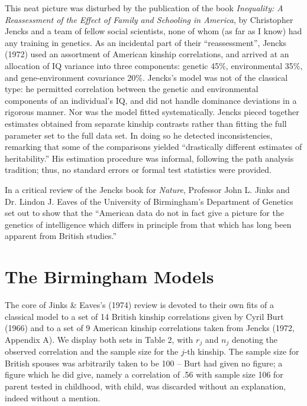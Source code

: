 ﻿\documentclass[12pt]{article}
\begin{document}
This neat picture was disturbed by the publication of the book \textit{Inequality: A Reassessment of the Effect of Family and Schooling in America}, by Christopher Jencks and a team of fellow social scientists, none of whom (as far as I know) had any training in genetics. As an incidental part of their ``reassessment'', Jencks (1972) used an assortment of American kinship correlations, and arrived at an allocation of IQ variance into three components: genetic 45\%, environmental 35\%, and gene-environment covariance 20\%. Jencks's model was not of the classical type: he permitted correlation between the genetic and environmental components of an individual's IQ, and did not handle dominance deviations in a rigorous manner. Nor was the model fitted systematically. Jencks pieced together estimates obtained from separate kinship contrasts rather than fitting the full parameter set to the full data set. In doing so he detected inconsistencies, remarking that some of the comparisons yielded ``drastically different estimates of heritability.'' His estimation procedure was informal, following the path analysis tradition; thus, no standard errors or formal test statistics were provided.

In a critical review of the Jencks book for \textit{Nature}, Professor John L. Jinks and Dr. Lindon J. Eaves of the University of Birmingham's Department of Genetics set out to show that the ``American data do not in fact give a picture for the genetics of intelligence which differs in principle from that which has long been apparent from British studies.''

\section{The Birmingham Models}

The core of Jinks \& Eaves's (1974) review is devoted to their own fits of a classical model to a set of 14 British kinship correlations given by Cyril Burt (1966) and to a set of 9 American kinship correlations taken from Jencks (1972, Appendix A). We display both sets in Table 2, with $r_j$ and $n_j$ denoting the observed correlation and the sample size for the $j$-th kinship. The sample size for British spouses was arbitrarily taken to be 100 -- Burt had given no figure; a figure which he did give, namely a correlation of .56 with sample size 106 for parent tested in childhood, with child, was discarded without an explanation, indeed without a mention.
\end{document}
